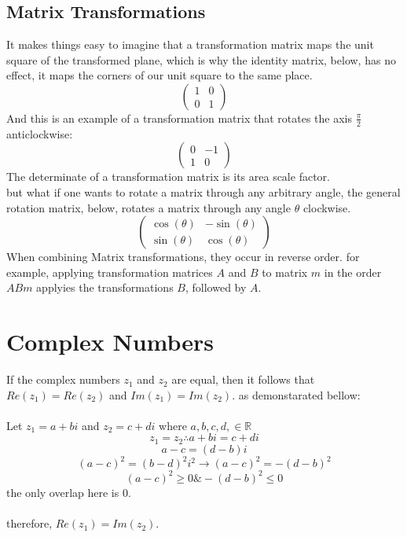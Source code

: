 \documentclass{article}
\begin{document}
                \subsection{Matrix Transformations}
                        It makes things easy to imagine that a transformation matrix maps the unit square of the transformed plane, which is why the identity matrix, below,  has no effect, it maps the corners of our unit square to the same place.
                        \[\left(\begin{array}{cc} 1 & 0 \\ 0 & 1 \end{array}\right)\]
                        And this is an example of a transformation matrix that rotates the axis \(\frac{\pi}{2}\) anticlockwise:
                        \[\left(\begin{array}{cc} 0 & -1 \\ 1 & 0 \end{array}\right)\]
                        The determinate of a transformation matrix is its area scale factor. \\ but what if one wants to rotate a matrix through any arbitrary angle, the general rotation matrix, below, rotates a matrix through any angle \(\theta\) clockwise.
                        \[\left(\begin{array}{cc} \cos\left(\theta\right) & -\sin\left(\theta\right) \\ \sin\left(\theta\right) & \cos\left(\theta\right) \end{array}\right)\]
                        When combining Matrix transformations, they occur in reverse order. for example, applying transformation matrices \(A\) and \(B\) to matrix \(m\) in the order \(ABm\) applyies the transformations \(B\), followed by \(A\).

\section{Complex Numbers}
                If the complex numbers \(z_1\) and \(z_2\) are equal, then it follows that \(Re\left(z_1\right) = Re\left(z_2\right)\) and \(Im\left(z_1\right) = Im\left(z_2\right)\). as demonstarated bellow: \\\\
                Let \(z_1 = a+bi\) and \(z_2 = c+di\) where \(a,b,c,d, \in \mathbb{R}\)
                \[z_1 = z_2 \therefore a+bi = c+di\]
                \[a-c=\left(d-b\right)i\]
                \[\left(a-c\right)^2=\left(b-d\right)^2i^2 \rightarrow \left(a-c\right)^2=-\left(d-b\right)^2\]
                \[\left(a-c\right)^2\geq 0 \& -\left(d-b\right)^2\leq 0\]
                the only overlap here is 0. \\\\
                therefore, \(Re\left(z_1\right) = Im\left(z_2\right).\)
\end{document}
